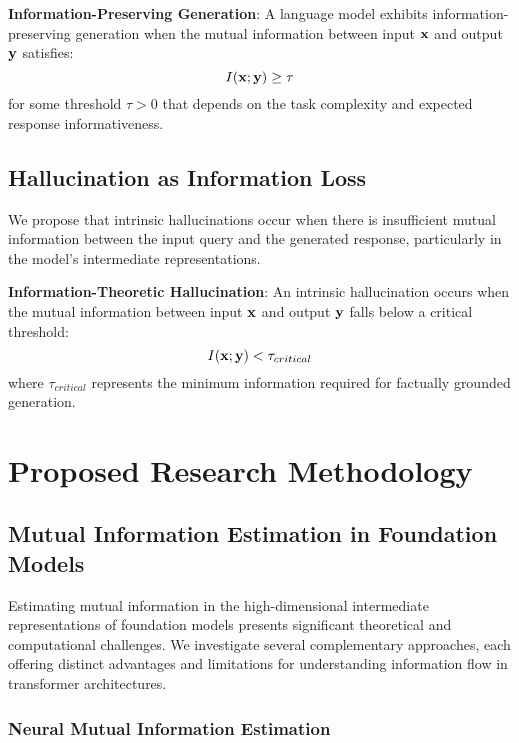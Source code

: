 \begin{definition}
\textbf{Information-Preserving Generation}: A language model exhibits information-preserving generation when the mutual information between input ${\mathbf{x}}$ and output ${\mathbf{y}}$ satisfies:
\[
I({\mathbf{x}}; {\mathbf{y}}) \geq \tau
\]
for some threshold $\tau > 0$ that depends on the task complexity and expected response informativeness.
\label{def:info_preserving}
\end{definition}

\subsection{Hallucination as Information Loss}
\label{subsec:hall_info_loss}

We propose that intrinsic hallucinations occur when there is insufficient mutual information between the input query and the generated response, particularly in the model's intermediate representations.

\begin{definition}
\textbf{Information-Theoretic Hallucination}: An intrinsic hallucination occurs when the mutual information between input ${\mathbf{x}}$ and output ${\mathbf{y}}$ falls below a critical threshold:
\[
I({\mathbf{x}}; {\mathbf{y}}) < \tau_{critical}
\]
where $\tau_{critical}$ represents the minimum information required for factually grounded generation.
\label{def:it_hallucination}
\end{definition}

\section{Proposed Research Methodology}
\label{sec:methodology}

\subsection{Mutual Information Estimation in Foundation Models}
\label{subsec:mi_estimation}

Estimating mutual information in the high-dimensional intermediate representations of foundation models presents significant theoretical and computational challenges. We investigate several complementary approaches, each offering distinct advantages and limitations for understanding information flow in transformer architectures.

\subsubsection{Neural Mutual Information Estimation}

